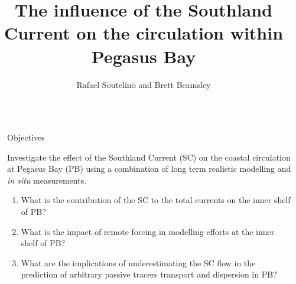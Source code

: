 \documentclass[final]{beamer}
\title{The influence of the Southland Current on the circulation within Pegasus Bay} %
\author{Rafael Soutelino and Brett Beamsley} %
\institute{MetOcean Solutions} %
\newlength{\sepwid}
\newlength{\onecolwid}
\begin{document}

\setlength{\belowcaptionskip}{2ex} %
\setlength\belowdisplayshortskip{2ex} %

\begin{frame}[t] %

\begin{columns}[t] %

\begin{column}{\sepwid}\end{column} %

\begin{column}{\onecolwid} %


    \begin{alertblock}{Objectives}

    Investigate the effect of the Southland Current (SC) on the coastal circulation at Pegasus Bay (PB) using a combination of long term realistic modelling and {\it in situ} measurements.

    \begin{enumerate}
    \item What is the contribution of the SC to the total currents on the inner shelf of PB?
    \item What is the impact of remote forcing in modelling efforts at the inner shelf of PB?
    \item What are the implications of underestimating the SC flow in the prediction of arbitrary passive tracers transport and dispersion in PB?
    \end{enumerate}

    \end{alertblock}



\end{column}
\end{columns}
\end{frame}
\end{document}
